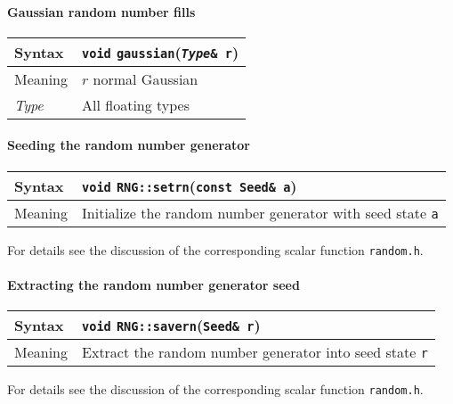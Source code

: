 \documentclass[12pt,letterpaper]{article}
\newcommand{\tRandomState}{Seed}
\newcommand{\allFloatTypes}{All floating types}
\newcommand{\itt}{\it Type}
\begin{document}
\paragraph{Gaussian random number fills}

\begin{flushleft}
  \begin{tabular}{|l|l|}
  \hline
  Syntax      & {\tt void} \verb|gaussian|({\tt {\it Type}\& r}) \\
  \hline
  Meaning     & $r$ normal Gaussian \\
  \hline
  \itt        & \allFloatTypes \\
  \hline
  \end{tabular}
\end{flushleft}

\paragraph{Seeding the random number generator}

\begin{flushleft}
  \begin{tabular}{|l|l|}
  \hline
  Syntax      & {\tt void} \verb|RNG::setrn|({\tt const \tRandomState\& a}) \\
  \hline
  Meaning     & Initialize the random number generator with seed state \verb|a|\\
  \hline
  \end{tabular}
\end{flushleft}

For details see the discussion of the corresponding scalar function
{\tt random.h}.

\paragraph{Extracting the random number generator seed}

\begin{flushleft}
  \begin{tabular}{|l|l|}
  \hline
  Syntax      & {\tt void} \verb|RNG::savern|({\tt \tRandomState\& r}) \\
  \hline
  Meaning     & Extract the random number generator into seed state \verb|r|\\
  \hline
  \end{tabular}
\end{flushleft}

For details see the discussion of the corresponding scalar function
{\tt random.h}.
\end{document}
